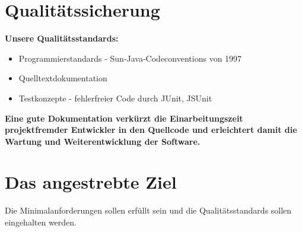 \documentclass{article}
\begin{document}
\section{Qualitätssicherung}
\textbf{Unsere Qualitätsstandards:}
\begin{itemize}
\item Programmierstandards - Sun-Java-Codeconventions von 1997
\item Quelltextdokumentation
\item Testkonzepte - fehlerfreier Code durch	 JUnit, JSUnit
\end{itemize}
\par\bigskip	
\textbf{Eine
gute Dokumentation verkürzt die Einarbeitungszeit projektfremder
Entwickler in den Quellcode und erleichtert damit die Wartung und
Weiterentwicklung der Software.}

\section{Das angestrebte Ziel}
Die Minimalanforderungen sollen erfüllt sein und die Qualitätsstandards sollen eingehalten werden.

\end{document}
